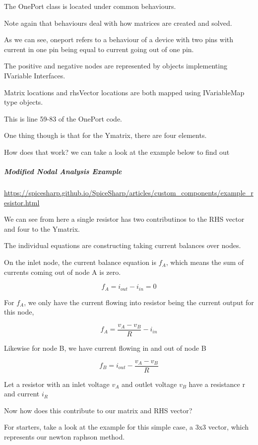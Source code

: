 \documentclass[12pt]{article}
\renewcommand{\_}{\kern-1.5pt\textunderscore\kern-1.5pt}
\begin{document}
The OnePort class is located under common behaviours.

Note again that behaviours deal with how matrices are created and solved.

As we can see, oneport refers to a behaviour of a device with two pins with current in one pin being equal to current going out of one pin.

The positive and negative nodes are represented by objects implementing IVariable Interfaces.

Matrix locations and rhsVector locations are both mapped using IVariableMap type objects.

This is line 59-83 of the OnePort code.

One thing though is that for the Ymatrix, there are four elements.

How does that work? we can take a look at the example below to find out

\subparagraph{Modified Nodal Analysis Example}


\url{https://spicesharp.github.io/SpiceSharp/articles/custom_components/example_resistor.html}

We can see from here a single resistor has two contributinos to the RHS vector and four to the Ymatrix.

The individual equations are constructing taking current balances over nodes.

On the inlet node, the current balance equation is $f_A$, which means the sum of currents coming out of node A is zero.

$$f_{A} = i_{out} - i_{in} = 0 $$

For $f_A$, we only have the current flowing into resistor being the current output for this node,

$$f_A = \frac{v_A - v_B}{R} - i_{in}$$

Likewise for node B, we have current flowing in and out of node B

$$f_B =  i_{out} - \frac{v_A - v_B}{R} $$


Let a resistor with an inlet voltage $v_A$ and outlet voltage $v_B$ have a resistance r and current $i_R$

Now how does this contribute to our matrix and RHS vector?

For starters, take a look at the example for this simple case, a 3x3 vector, which represents our newton raphson method.
\end{document}

